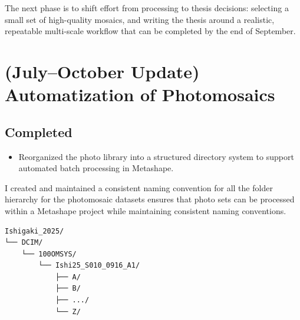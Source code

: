 \documentclass[a4paper,12pt]{article}
\begin{document}
The next phase is to shift effort from processing to thesis decisions: selecting a small set of high-quality mosaics, and writing the thesis around a realistic, repeatable multi-scale workflow that can be completed by the end of September.

\newpage


\section{(July--October Update) Automatization of Photomosaics}


\subsection{Completed}
\begin{itemize}
    \item Reorganized the photo library into a structured directory system to support automated batch processing in Metashape.
\end{itemize}

\begin{tcolorbox}[title=Folder Structure]
I created and maintained a consistent naming convention for all the folder hierarchy for the photomosaic datasets ensures that photo sets can be processed within a Metashape project while maintaining consistent naming conventions.
\begin{verbatim}
Ishigaki_2025/
└── DCIM/
    └── 100OMSYS/
        └── Ishi25_S010_0916_A1/
            ├── A/
            ├── B/
            ├── .../
            └── Z/
\end{verbatim}
\end{tcolorbox}
\end{document}
